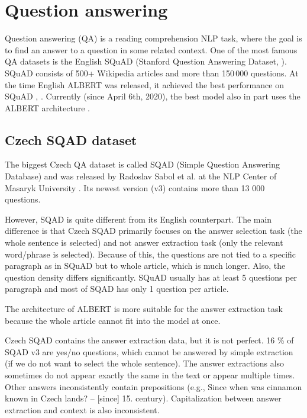 \documentclass[
  printed, %
  color,   %
  table,   %
  oneside, %
  lof,     %
  lot,     %
]{fithesis3}
\begin{document}
\clearpage

\section{Question answering}
Question answering (QA) is a reading comprehension NLP task, where the goal is to find an answer to a question in some related context. One of the most famous QA datasets is the English SQuAD (Stanford Question Answering Dataset, \parencite{squad}). SQuAD consists of 500+ Wikipedia articles and more than 150\,000 questions. At the time English ALBERT was released, it achieved the best performance on SQuAD \parencite[Table 10]{albert}, \parencite{squad}. Currently (since April 6th, 2020), the best model also in part uses the ALBERT architecture \parencite{squad}.


\subsection{Czech SQAD dataset}
The biggest Czech QA dataset is called SQAD (Simple Question Answering Database) and was released by Radoslav Sabol et al. at the NLP Center of Masaryk University \parencite{sqad}. Its newest version (v3) contains more than 13 000 questions.

However, SQAD is quite different from its English counterpart. The main difference is that Czech SQAD primarily focuses on the answer selection task (the whole sentence is selected) and not answer extraction task (only the relevant word/phrase is selected). Because of this, the questions are not tied to a specific paragraph as in SQuAD but to whole article, which is much longer. Also, the question density differs significantly. SQuAD usually has at least 5 questions per paragraph and most of SQAD has only 1 question per article.

The architecture of ALBERT is more suitable for the answer extraction task because the whole article cannot fit into the model at once.

Czech SQAD contains the answer extraction data, but it is not perfect. 16 \% of SQAD v3 are yes/no questions, which cannot be answered by simple extraction (if we do not want to select the whole sentence). The answer extractions also sometimes do not appear exactly the same in the text or appear multiple times. Other answers inconsistently contain prepositions (e.g., Since when was cinnamon known in Czech lands? -- [since] 15. century). Capitalization between answer extraction and context is also inconsistent.
\end{document}
